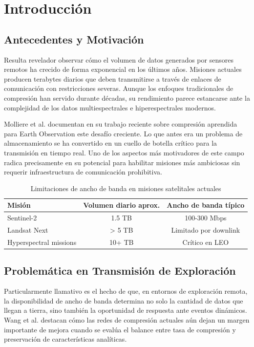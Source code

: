 \section{Introducción}

\subsection{Antecedentes y Motivación}

Resulta revelador observar cómo el volumen de datos generados por sensores remotos ha crecido de forma exponencial en los últimos años. Misiones actuales producen terabytes diarios que deben transmitirse a través de enlaces de comunicación con restricciones severas. Aunque los enfoques tradicionales de compresión han servido durante décadas, su rendimiento parece estancarse ante la complejidad de los datos multiespectrales e hiperespectrales modernos.

Molliere et al. \cite{Molliere2025_Learned_EO_Compression} documentan en su trabajo reciente sobre compresión aprendida para Earth Observation este desafío creciente. Lo que antes era un problema de almacenamiento se ha convertido en un cuello de botella crítico para la transmisión en tiempo real. Uno de los aspectos más motivadores de este campo radica precisamente en su potencial para habilitar misiones más ambiciosas sin requerir infraestructura de comunicación prohibitiva.

\begin{table}[h]
\centering
\caption{Limitaciones de ancho de banda en misiones satelitales actuales}
\label{tab:limitaciones_bw}
\begin{tabular}{lcc}
\hline
\textbf{Misión} & \textbf{Volumen diario aprox.} & \textbf{Ancho de banda típico} \\
\hline
Sentinel-2 & 1.5 TB & 100-300 Mbps \\
Landsat Next & > 5 TB & Limitado por downlink \\
Hyperspectral missions & 10+ TB & Crítico en LEO \\
\hline
\end{tabular}
\end{table}

\subsection{Problemática en Transmisión de Exploración}

Particularmente llamativo es el hecho de que, en entornos de exploración remota, la disponibilidad de ancho de banda determina no solo la cantidad de datos que llegan a tierra, sino también la oportunidad de respuesta ante eventos dinámicos. Wang et al. \cite{Wang2025_RS_Compression} destacan cómo las redes de compresión actuales aún dejan un margen importante de mejora cuando se evalúa el balance entre tasa de compresión y preservación de características analíticas.

